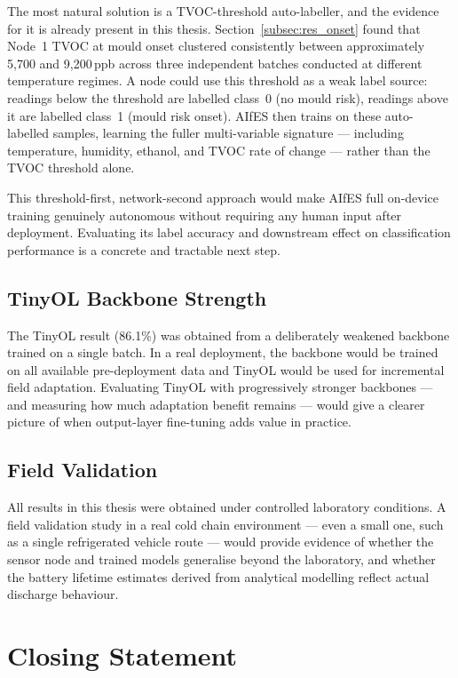 The most natural solution is a TVOC-threshold auto-labeller, and the evidence for it is already present in this thesis. Section~\ref{subsec:res_onset} found that Node~1 TVOC at mould onset clustered consistently between approximately 5,700 and 9,200\,ppb across three independent batches conducted at different temperature regimes. A node could use this threshold as a weak label source: readings below the threshold are labelled class~0 (no mould risk), readings above it are labelled class~1 (mould risk onset). AIfES then trains on these auto-labelled samples, learning the fuller multi-variable signature --- including temperature, humidity, ethanol, and TVOC rate of change --- rather than the TVOC threshold alone.

This threshold-first, network-second approach would make AIfES full on-device training genuinely autonomous without requiring any human input after deployment. Evaluating its label accuracy and downstream effect on classification performance is a concrete and tractable next step.

\subsection{TinyOL Backbone Strength}

The TinyOL result (86.1\%) was obtained from a deliberately weakened backbone trained on a single batch. In a real deployment, the backbone would be trained on all available pre-deployment data and TinyOL would be used for incremental field adaptation. Evaluating TinyOL with progressively stronger backbones --- and measuring how much adaptation benefit remains --- would give a clearer picture of when output-layer fine-tuning adds value in practice.

\subsection{Field Validation}

All results in this thesis were obtained under controlled laboratory conditions. A field validation study in a real cold chain environment --- even a small one, such as a single refrigerated vehicle route --- would provide evidence of whether the sensor node and trained models generalise beyond the laboratory, and whether the battery lifetime estimates derived from analytical modelling reflect actual discharge behaviour.

\section{Closing Statement}\label{sec:closing}


